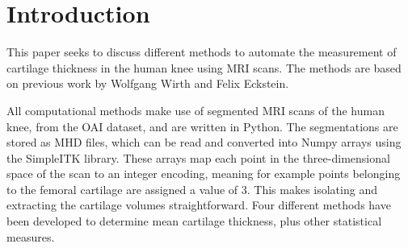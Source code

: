 \section{Introduction}
This paper seeks to discuss different methods to automate the measurement of cartilage thickness in the human knee using MRI scans. The methods are based on previous work by Wolfgang Wirth and Felix Eckstein. \cite{wirth2008technique}
\par\noindent
All computational methods make use of segmented MRI scans of the human knee, from the OAI dataset, and are written in Python. The segmentations are stored as MHD files, which can be read and converted into Numpy arrays using the SimpleITK library. These arrays map each point in the three-dimensional space of the scan to an integer encoding, meaning for example points belonging to the femoral cartilage are assigned a value of 3. This makes isolating and extracting the cartilage volumes straightforward. Four different methods have been developed to determine mean cartilage thickness, plus other statistical measures.

